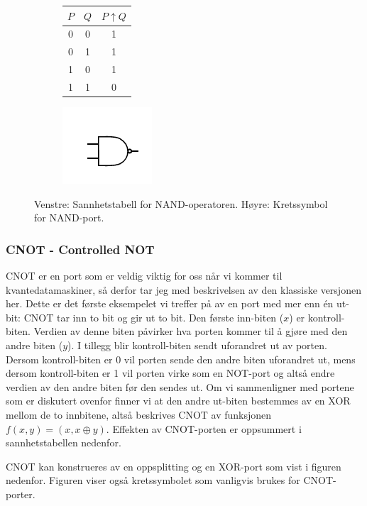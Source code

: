 \begin{center}
\begin{figure}[h]
\begin{subfigure}{.3\textwidth}
	\begin{tabular}{|c|c|c|}
	\hline
	$P$ & $Q$ & $P \uparrow Q$ \\
	\hline
	0 & 0 & 1\\
	0 & 1 & 1 \\
	1 & 0 & 1 \\
	1 & 1 & 0 \\
	\hline
	\end{tabular}
\end{subfigure}
\begin{subfigure}{.3\textwidth}
	\includegraphics{./gate_nand}
\end{subfigure}
\caption{Venstre: Sannhetstabell for NAND-operatoren. Høyre: Kretssymbol for NAND-port.}
\end{figure}
\end{center}

\subsubsection{CNOT - Controlled NOT}
CNOT er en port som er veldig viktig for oss når vi kommer til kvantedatamaskiner, så derfor tar jeg med beskrivelsen av den klassiske versjonen her. Dette er det første eksempelet vi treffer på av en port med mer enn \'en ut-bit: CNOT tar inn to bit og gir ut to bit. Den første inn-biten ($x$) er kontroll-biten. Verdien av denne biten påvirker hva porten kommer til å gjøre med den andre biten ($y$). I tillegg blir kontroll-biten sendt uforandret ut av porten. Dersom kontroll-biten er 0 vil porten sende den andre biten uforandret ut, mens dersom kontroll-biten er 1 vil porten virke som en NOT-port og altså endre verdien av den andre biten før den sendes ut. Om vi sammenligner med portene som er diskutert ovenfor finner vi at den andre ut-biten bestemmes av en XOR mellom de to innbitene, altså beskrives CNOT av funksjonen $f(x,y) = (x, x\oplus y)$. Effekten av CNOT-porten er oppsummert i sannhetstabellen nedenfor.

CNOT kan konstrueres av en oppsplitting og en XOR-port som vist i figuren nedenfor. Figuren viser også kretssymbolet som vanligvis brukes for CNOT-porter.

